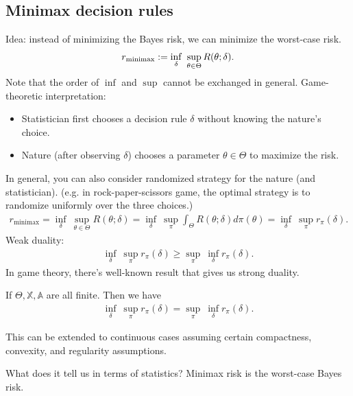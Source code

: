 \documentclass[11pt,letterpaper]{article}
\numberwithin{theorem}{lecture}
\numberwithin{proposition}{lecture}
\numberwithin{lemma}{lecture}
\numberwithin{claim}{lecture}
\numberwithin{corollary}{lecture}
\numberwithin{definition}{lecture}
\numberwithin{conjecture}{lecture}
\numberwithin{remark}{lecture}
\numberwithin{example}{lecture}
\numberwithin{equation}{lecture}
\begin{document}
\subsection{Minimax decision rules}
Idea: instead of minimizing the Bayes risk, we can minimize the worst-case risk.
\begin{align*}
    r_{\mathrm{minimax}} := \inf_\delta~ \sup_{\theta \in \Theta} R(\theta; \delta).
\end{align*}
Note that the order of $\inf$ and $\sup$ cannot be exchanged in general. Game-theoretic interpretation:
\begin{itemize}
  \item Statistician first chooses a decision rule $\delta$ without knowing the nature's choice.
  \item Nature (after observing $\delta$) chooses a parameter $\theta \in \Theta$ to maximize the risk.
\end{itemize}
In general, you can also consider randomized strategy for the nature (and statistician). (e.g. in rock-paper-scissors game, the optimal strategy is to randomize uniformly over the three choices.)
\begin{align*}
    r_{\mathrm{minimax}} = \inf_\delta~ \sup_{\theta \in \Theta} R(\theta; \delta) = \inf_\delta~ \sup_{\pi} \int_\Theta R(\theta; \delta) d\pi(\theta) = \inf_\delta~ \sup_{\pi} r_\pi (\delta).
\end{align*}
Weak duality:
\begin{align*}
    \inf_\delta~ \sup_{\pi} r_\pi (\delta) \geq \sup_{\pi}~ \inf_\delta r_\pi (\delta).
\end{align*}
In game theory, there's well-known result that gives us strong duality.
\begin{theorem}
  If $\Theta, \mathbb{X}, \mathbb{A}$ are all finite. Then we have
  \begin{align*}
    \inf_\delta~ \sup_{\pi} r_\pi (\delta) = \sup_{\pi}~ \inf_\delta r_\pi (\delta).
  \end{align*}
\end{theorem}
This can be extended to continuous cases assuming certain compactness, convexity, and regularity assumptions.

What does it tell us in terms of statistics? Minimax risk is the worst-case Bayes risk.
\end{document}
